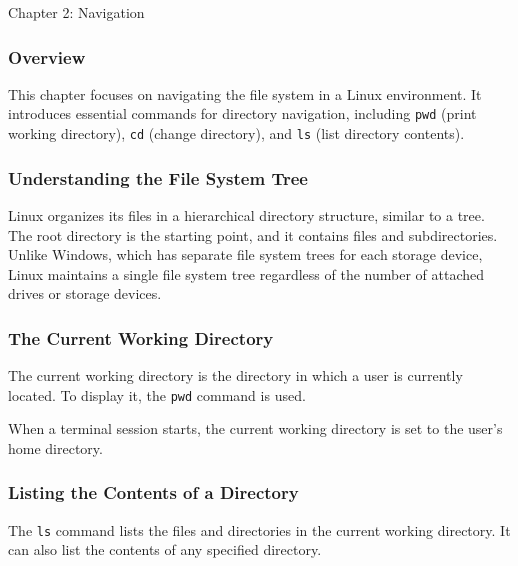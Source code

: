 \begin{notes}{Chapter 2: Navigation}
    \subsubsection*{Overview}

    This chapter focuses on navigating the file system in a Linux environment. It introduces essential commands for directory navigation, including \texttt{pwd} (print working directory), 
    \texttt{cd} (change directory), and \texttt{ls} (list directory contents).

    \subsubsection*{Understanding the File System Tree}

    Linux organizes its files in a hierarchical directory structure, similar to a tree. The root directory is the starting point, and it contains files and subdirectories. Unlike Windows, which 
    has separate file system trees for each storage device, Linux maintains a single file system tree regardless of the number of attached drives or storage devices.

    \subsubsection*{The Current Working Directory}

    The current working directory is the directory in which a user is currently located. To display it, the \texttt{pwd} command is used.

    \begin{highlight}
    \end{highlight}

    When a terminal session starts, the current working directory is set to the user's home directory.

    \subsubsection*{Listing the Contents of a Directory}

    The \texttt{ls} command lists the files and directories in the current working directory. It can also list the contents of any specified directory.


\end{notes}
